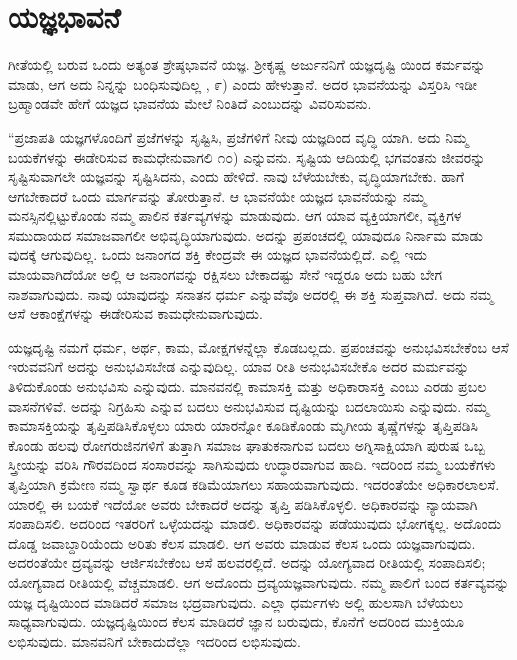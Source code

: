 \section*{ಯಜ್ಞಭಾವನೆ}

ಗೀತೆಯಲ್ಲಿ ಬರುವ ಒಂದು ಅತ್ಯಂತ ಶ್ರೇಷ್ಠಭಾವನೆ ಯಜ್ಞ. ಶ್ರೀಕೃಷ್ಣ ಅರ್ಜುನನಿಗೆ ಯಜ್ಞದೃಷ್ಟಿ ಯಿಂದ ಕರ್ಮವನ್ನು ಮಾಡು, ಆಗ ಅದು ನಿನ್ನನ್ನು ಬಂಧಿಸುವುದಿಲ್ಲ , ೯) ಎಂದು ಹೇಳುತ್ತಾನೆ. ಅದರ ಭಾವನೆಯನ್ನು ವಿಸ್ತರಿಸಿ ಇಡೀ ಬ್ರಹ್ಮಾಂಡವೇ ಹೇಗೆ ಯಜ್ಞದ ಭಾವನೆಯ ಮೇಲೆ ನಿಂತಿದೆ ಎಂಬುದನ್ನು ವಿವರಿಸುವನು.

“ಪ್ರಜಾಪತಿ ಯಜ್ಞಗಳೊಂದಿಗೆ ಪ್ರಜೆಗಳನ್ನು ಸೃಷ್ಟಿಸಿ, ಪ್ರಜೆಗಳಿಗೆ ನೀವು ಯಜ್ಞದಿಂದ ವೃದ್ಧಿ ಯಾಗಿ. ಅದು ನಿಮ್ಮ ಬಯಕೆಗಳನ್ನು ಈಡೇರಿಸುವ ಕಾಮಧೇನುವಾಗಲಿ ೧೦) ಎನ್ನುವನು. ಸೃಷ್ಟಿಯ ಆದಿಯಲ್ಲಿ ಭಗವಂತನು ಜೀವರನ್ನು ಸೃಷ್ಟಿಸುವಾಗಲೇ ಯಜ್ಞವನ್ನು ಸೃಷ್ಟಿಸಿದನು, ಎಂದು ಹೇಳಿದೆ. ನಾವು ಬೆಳೆಯಬೇಕು, ವೃದ್ಧಿಯಾಗಬೇಕು. ಹಾಗೆ ಆಗಬೇಕಾದರೆ ಒಂದು ಮಾರ್ಗವನ್ನು ತೋರುತ್ತಾನೆ. ಆ ಭಾವನೆಯೇ ಯಜ್ಞದ ಭಾವನೆಯನ್ನು ನಮ್ಮ ಮನಸ್ಸಿನಲ್ಲಿಟ್ಟುಕೊಂಡು ನಮ್ಮ ಪಾಲಿನ ಕರ್ತವ್ಯಗಳನ್ನು ಮಾಡುವುದು. ಆಗ ಯಾವ ವ್ಯಕ್ತಿಯಾಗಲೀ, ವ್ಯಕ್ತಿಗಳ ಸಮುದಾಯದ ಸಮಾಜವಾಗಲೀ ಅಭಿವೃದ್ಧಿಯಾಗುವುದು. ಅದನ್ನು ಪ್ರಪಂಚದಲ್ಲಿ ಯಾವುದೂ ನಿರ್ನಾಮ ಮಾಡು ವುದಕ್ಕೆ ಆಗುವುದಿಲ್ಲ. ಒಂದು ಜನಾಂಗದ ಶಕ್ತಿ ಕೇಂದ್ರವೇ ಈ ಯಜ್ಞದ ಭಾವನೆಯಲ್ಲಿದೆ. ಎಲ್ಲಿ ಇದು ಮಾಯವಾಗಿದೆಯೋ ಅಲ್ಲಿ ಆ ಜನಾಂಗವನ್ನು ರಕ್ಷಿಸಲು ಬೇಕಾದಷ್ಟು ಸೇನೆ ಇದ್ದರೂ ಅದು ಬಹು ಬೇಗ ನಾಶವಾಗುವುದು. ನಾವು ಯಾವುದನ್ನು ಸನಾತನ ಧರ್ಮ ಎನ್ನುವೆವೊ ಅದರಲ್ಲಿ ಈ ಶಕ್ತಿ ಸುಪ್ತವಾಗಿದೆ. ಅದು ನಮ್ಮ ಆಸೆ ಆಕಾಂಕ್ಷೆಗಳನ್ನು ಈಡೇರಿಸುವ ಕಾಮಧೇನುವಾಗುವುದು.

ಯಜ್ಞದೃಷ್ಟಿ ನಮಗೆ ಧರ್ಮ, ಅರ್ಥ, ಕಾಮ, ಮೋಕ್ಷಗಳನ್ನೆಲ್ಲಾ ಕೊಡಬಲ್ಲದು. ಪ್ರಪಂಚವನ್ನು ಅನುಭವಿಸಬೇಕೆಂಬ ಆಸೆ ಇರುವವನಿಗೆ ಅದನ್ನು ಅನುಭವಿಸಬೇಡ ಎನ್ನುವುದಿಲ್ಲ. ಯಾವ ರೀತಿ ಅನುಭವಿಸಬೇಕೊ ಅದರ ಮರ್ಮವನ್ನು ತಿಳಿದುಕೊಂಡು ಅನುಭವಿಸು ಎನ್ನುವುದು. ಮಾನವನಲ್ಲಿ ಕಾಮಾಸಕ್ತಿ ಮತ್ತು ಅಧಿಕಾರಾಸಕ್ತಿ ಎಂಬು ಎರಡು ಪ್ರಬಲ ವಾಸನೆಗಳಿವೆ. ಅದನ್ನು ನಿಗ್ರಹಿಸು ಎನ್ನುವ ಬದಲು ಅನುಭವಿಸುವ ದೃಷ್ಟಿಯನ್ನು ಬದಲಾಯಿಸು ಎನ್ನುವುದು. ನಮ್ಮ ಕಾಮಾಸಕ್ತಿಯನ್ನು ತೃಪ್ತಿಪಡಿಸಿಕೊಳ್ಳಲು ಯಾರು ಯಾರನ್ನೋ ಕೂಡಿಕೊಂಡು ಮೃಗೀಯ ತೃಷ್ಣೆಗಳನ್ನು ತೃಪ್ತಿಪಡಿಸಿ ಕೊಂಡು ಹಲವು ರೋಗರುಜಿನಗಳಿಗೆ ತುತ್ತಾಗಿ ಸಮಾಜ ಘಾತುಕನಾಗುವ ಬದಲು ಅಗ್ನಿಸಾಕ್ಷಿಯಾಗಿ ಪುರುಷ ಒಬ್ಬ ಸ್ತ್ರೀಯನ್ನು ವರಿಸಿ ಗೌರವದಿಂದ ಸಂಸಾರವನ್ನು ಸಾಗಿಸುವುದು ಉದ್ಧಾರವಾಗುವ ಹಾದಿ. ಇದರಿಂದ ನಮ್ಮ ಬಯಕೆಗಳು ತೃಪ್ತಿಯಾಗಿ ಕ್ರಮೇಣ ನಮ್ಮ ಸ್ವಾರ್ಥ ಕೂಡ ಕಡಿಮೆಯಾಗಲು ಸಹಾಯವಾಗುವುದು. ಇದರಂತೆಯೇ ಅಧಿಕಾರಲಾಲಸೆ. ಯಾರಲ್ಲಿ ಈ ಬಯಕೆ ಇದೆಯೋ ಅವರು ಬೇಕಾದರೆ ಅದನ್ನು ತೃಪ್ತಿ ಪಡಿಸಿಕೊಳ್ಳಲಿ. ಅಧಿಕಾರವನ್ನು ನ್ಯಾಯವಾಗಿ ಸಂಪಾದಿಸಲಿ. ಅದರಿಂದ ಇತರರಿಗೆ ಒಳ್ಳೆಯದನ್ನು ಮಾಡಲಿ. ಅಧಿಕಾರವನ್ನು ಪಡೆಯುವುದು ಭೋಗಕ್ಕಲ್ಲ. ಅದೊಂದು ದೊಡ್ಡ ಜವಾಬ್ದಾರಿಯೆಂದು ಅರಿತು ಕೆಲಸ ಮಾಡಲಿ. ಆಗ ಅವರು ಮಾಡುವ ಕೆಲಸ ಒಂದು ಯಜ್ಞವಾಗುವುದು. ಅದರಂತೆಯೇ ದ್ರವ್ಯವನ್ನು ಆರ್ಜಿಸಬೇಕೆಂಬ ಆಸೆ ಹಲವರಲ್ಲಿದೆ. ಅದನ್ನು ಯೋಗ್ಯವಾದ ರೀತಿಯಲ್ಲಿ ಸಂಪಾದಿಸಲಿ; ಯೋಗ್ಯವಾದ ರೀತಿಯಲ್ಲಿ ವೆಚ್ಚಮಾಡಲಿ. ಆಗ ಅದೊಂದು ದ್ರವ್ಯಯಜ್ಞವಾಗುವುದು. ನಮ್ಮ ಪಾಲಿಗೆ ಬಂದ ಕರ್ತವ್ಯವನ್ನು ಯಜ್ಞ ದೃಷ್ಟಿಯಿಂದ ಮಾಡಿದರೆ ಸಮಾಜ ಭದ್ರವಾಗುವುದು. ಎಲ್ಲಾ ಧರ್ಮಗಳು ಅಲ್ಲಿ ಹುಲಸಾಗಿ ಬೆಳೆಯಲು ಸಾಧ್ಯವಾಗುವುದು. ಯಜ್ಞದೃಷ್ಟಿಯಿಂದ ಕೆಲಸ ಮಾಡಿದರೆ ಜ್ಞಾನ ಬರುವುದು, ಕೊನೆಗೆ ಅದರಿಂದ ಮುಕ್ತಿಯೂ ಲಭಿಸುವುದು. ಮಾನವನಿಗೆ ಬೇಕಾದುದೆಲ್ಲಾ ಇದರಿಂದ ಲಭಿಸುವುದು.

